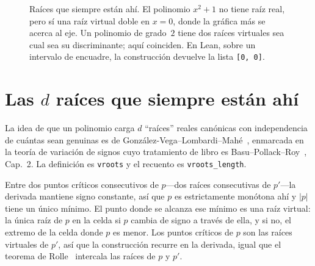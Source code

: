 \documentclass[11pt]{article}
\newcommand{\lean}[1]{\texttt{#1}}
\begin{document}
\begin{figure}[htbp]
\centering
{}
\caption{Ra\'ices que siempre est\'an ah\'i. El polinomio $x^2+1$ no tiene ra\'iz real, pero s\'i una
ra\'iz virtual doble en $x=0$, donde la gr\'afica m\'as se acerca al eje. Un polinomio de grado~$2$
tiene dos ra\'ices virtuales sea cual sea su discriminante; aqu\'i coinciden. En Lean, sobre un
intervalo de encuadre, la construcci\'on devuelve la lista \lean{[0,\,0]}.}
\label{fig:fillin}
\end{figure}

\section{Las \texorpdfstring{$d$}{d} ra\'ices que siempre est\'an ah\'i}\label{sec:q1}

La idea de que un polinomio carga $d$ ``ra\'ices'' reales can\'onicas con independencia de cu\'antas
sean genuinas es de Gonz\'alez-Vega--Lombardi--Mah\'e~\cite{glm}, enmarcada en la teor\'ia de
variaci\'on de signos cuyo tratamiento de libro es Basu--Pollack--Roy~\cite{bpr}, Cap.~2. La
definici\'on es \lean{vroots} y el recuento es \lean{vroots\_length}.

Entre dos puntos cr\'iticos consecutivos de $p$---dos ra\'ices
consecutivas de $p'$---la derivada mantiene signo constante, as\'i que $p$ es estrictamente
mon\'otona ah\'i y $|p|$ tiene un \'unico m\'inimo. El punto donde se alcanza ese m\'inimo es una
ra\'iz virtual: la \'unica ra\'iz de $p$ en la celda si $p$ cambia de signo a trav\'es de ella, y si
no, el extremo de la celda donde $p$ es menor. Los puntos cr\'iticos de $p$ son las ra\'ices virtuales
de $p'$, as\'i que la construcci\'on recurre en la derivada, igual que el teorema de Rolle~\cite{rolle}
intercala las ra\'ices de $p$ y $p'$.
\end{document}
